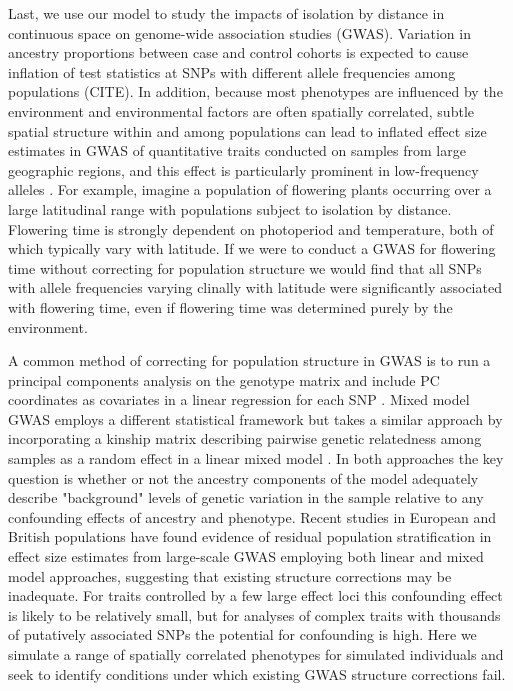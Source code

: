 \documentclass[9pt,twocolumn,twoside,lineno]{gsajnl}
\begin{document}
Last, we use our model to study the impacts of isolation by distance in continuous space on genome-wide association studies (GWAS). Variation in ancestry proportions between case and control cohorts is expected to cause inflation of test statistics at SNPs with different allele frequencies among populations (CITE). In addition, because most phenotypes are influenced by the environment and environmental factors are often spatially correlated, subtle spatial structure within and among populations can lead to inflated effect size estimates in GWAS of quantitative traits conducted on samples from large geographic regions, and this effect is particularly prominent in low-frequency alleles \citep{Mathieson2012}. For example, imagine a population of flowering plants occurring over a large latitudinal range with populations subject to isolation by distance. Flowering time is strongly dependent on photoperiod and temperature, both of which typically vary with latitude. If we were to conduct a GWAS for flowering time without correcting for population structure we would find that all SNPs with allele frequencies varying clinally with latitude were significantly associated with flowering time, even if flowering time was determined purely by the environment. 

A common method of correcting for population structure in GWAS is to run a principal components analysis on the genotype matrix and include PC coordinates as covariates in a linear regression for each SNP \citep{Price2006}. Mixed model GWAS employs a different statistical framework but takes a similar approach by incorporating a kinship matrix describing pairwise genetic relatedness among samples as a random effect in a linear mixed model \citep{Yu2006,Kang2008}. In both approaches the key question is whether or not the ancestry components of the model adequately describe "background" levels of genetic variation in the sample relative to any confounding effects of ancestry and phenotype. Recent studies in European and British populations \citep{Kerminen2018,Berg2018,Sohail2018} have found evidence of residual population stratification in effect size estimates from large-scale GWAS employing both linear and mixed model approaches, suggesting that existing structure corrections may be inadequate. For traits controlled by a few large effect loci this confounding effect is likely to be relatively small, but for analyses of complex traits with thousands of putatively associated SNPs the potential for confounding is high. Here we simulate a range of spatially correlated phenotypes for simulated individuals and seek to identify conditions under which existing GWAS structure corrections fail.  
\end{document}
